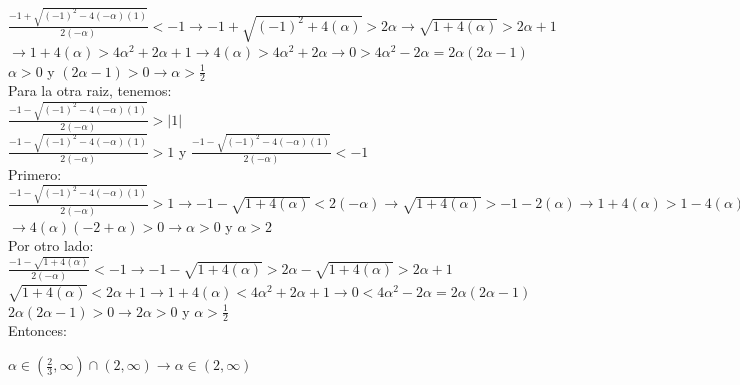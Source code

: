 \documentclass{article}
\begin{document}
$\frac{-1 + \sqrt{(-1)^2 - 4 (-\alpha)(1)}}{2(-\alpha)} < -1  \rightarrow  -1 + \sqrt{(-1)^2 + 4 (\alpha)}> 2\alpha  \rightarrow  \sqrt{1 + 4 (\alpha)}> 2\alpha +1 $\\

$\rightarrow  1 + 4 (\alpha)> 4\alpha^2 +2\alpha +1  \rightarrow  4 (\alpha)> 4\alpha^2 +2\alpha \rightarrow 0 > 4\alpha^2 -2\alpha = 2\alpha (2\alpha -1) $\\

$ \alpha >0 $  y  $(2\alpha -1) > 0  \rightarrow  \alpha > \frac{1}{2}$\\

Para la otra raiz, tenemos:\\

$\frac{-1 - \sqrt{(-1)^2 - 4 (-\alpha)(1)}}{2(-\alpha)} > |1|$ \\

$\frac{-1 - \sqrt{(-1)^2 - 4 (-\alpha)(1)}}{2(-\alpha)} > 1$   y  $\frac{-1 - \sqrt{(-1)^2 - 4 (-\alpha)(1)}}{2(-\alpha)} < -1$  \\

Primero:\\

$\frac{-1 - \sqrt{(-1)^2 - 4 (-\alpha)(1)}}{2(-\alpha)} > 1 \rightarrow -1 - \sqrt{1 + 4 (\alpha)} < 2(-\alpha)  \rightarrow \sqrt{1 + 4 (\alpha)} > -1-2(\alpha)  \rightarrow  1 + 4 (\alpha) > 1-4(\alpha) +4(\alpha)^2  \rightarrow  0 > -8(\alpha) +4(\alpha)^2 =4(\alpha)(-2 +\alpha)  $\\

$\rightarrow 4(\alpha)(-2 +\alpha) > 0  \rightarrow  \alpha >0 $ y $ \alpha >2 $\\

Por otro lado: \\

$\frac{-1 - \sqrt{1 + 4 (\alpha)}}{2(-\alpha)} < -1  \rightarrow  -1 - \sqrt{1 + 4 (\alpha)}> 2\alpha  -\sqrt{1 + 4 (\alpha)}> 2\alpha +1 $\\

$\sqrt{1 + 4 (\alpha)} < 2\alpha +1 \rightarrow 1 + 4 (\alpha) < 4\alpha^2 +2\alpha +1  \rightarrow  0 < 4\alpha^2 -2\alpha=  2\alpha(2\alpha-1)  $\\

$2\alpha(2\alpha-1)> 0 \rightarrow  2\alpha >0 $ y $\alpha > \frac{1}{2}$\\

Entonces:

$\alpha \in (\frac{2}{3}, \infty) \cap (2,\infty)  \rightarrow \alpha \in (2,\infty) $\\
\end{document}
